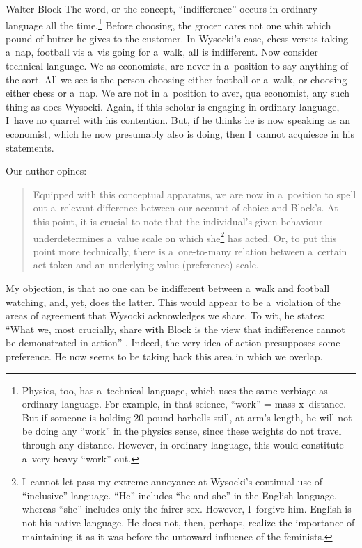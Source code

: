 \begin{artengenv}{Walter Block}
The word, or the concept, ``indifference'' occurs in ordinary language all the time.\footnote{Physics, too, has a~technical language, which uses the same verbiage as ordinary language. For example, in that science, ``work'' = mass x~distance. But if someone is holding 20 pound barbells still, at arm's length, he will not be doing any ``work'' in the physics sense, since these weights do not travel through any distance. However, in ordinary language, this would constitute a~very heavy ``work'' out. } Before choosing, the grocer cares not one whit which pound of butter he gives to the customer. In Wysocki's case, chess versus taking a~nap, football vis a~vis going for a~walk, all is indifferent. Now consider technical language. We as economists, are never in a~position to say anything of the sort. All we see is the person choosing either football or a~walk, or choosing either chess or a~nap. We are not in a~position to aver, qua economist, any such thing as does Wysocki. Again, if this scholar is engaging in ordinary language, I~have no quarrel with his contention. But, if he thinks he is now speaking as an economist, which he now presumably also is doing, then I~cannot acquiesce in his statements.



Our author opines:



\begin{quote}
Equipped with this conceptual apparatus, we are now in a~position to spell out a~relevant difference between our account of choice and Block's. At this point, it is crucial to note that the individual's given behaviour underdetermines a~value scale on which she\footnote{I~cannot let pass my extreme annoyance at Wysocki's continual use of ``inclusive'' language. ``He'' includes ``he and she'' in the English language, whereas ``she'' includes only the fairer sex. However, I~forgive him. English is not his native language. He does not, then, perhaps, realize the importance of maintaining it as it was before the untoward influence of the feminists.} has acted. Or, to put this point more technically, there is a~one-to-many relation between a~certain act-token and an underlying value (preference) scale.
\end{quote}



My objection, is that no one can be indifferent between a~walk and football watching, and, yet, does the latter. This would appear to be a~violation of the areas of agreement that Wysocki acknowledges we share. To wit, he states: ``What we, most crucially, share with Block is the view that indifference cannot be demonstrated in action'' 
\parencites[see e.g.,][]{block_rejoinder_2009}[][]{block_rejoinder_2009-1}[][]{rothbard_toward_2011}. %
 Indeed, the very idea of action presupposes some preference. He now seems to be taking back this area in which we overlap.




\end{artengenv}
